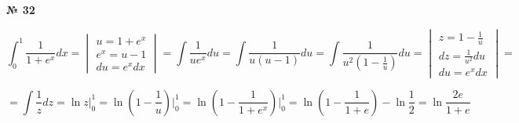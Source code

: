 \documentclass{article}
\begin{document}
\textbf{№ 32} 

$$ \int_{0}^{1} \frac{1}{1+e^{x}} dx 
= \begin{vmatrix} u = 1 + e^x \\
                e^x = u - 1 \\
                 du = e^{x}dx \end{vmatrix} 
= \int \frac{1}{ue^{x}} du
= \int \frac{1}{u(u-1)} du 
= \int \frac{1}{u^2(1 - \frac{1}{u})} du 
= \begin{vmatrix} z = 1 - \frac{1}{u} \\
                 dz = \frac{1}{u^2}du \\
                 du = e^{x}dx \end{vmatrix} 
= $$

$$ = \int \frac{1}{z} dz
= \ln{z} \bigg\vert_{0}^{1} 
= \ln{(1-\frac{1}{u})} \bigg\vert_{0}^{1} 
= \ln{(1-\frac{1}{1+e^x})} \bigg\vert_{0}^{1}
= \ln{(1-\frac{1}{1+e})} - \ln{\frac{1}{2}} 
= \ln{\frac{2e}{1+e}} $$
\end{document}
